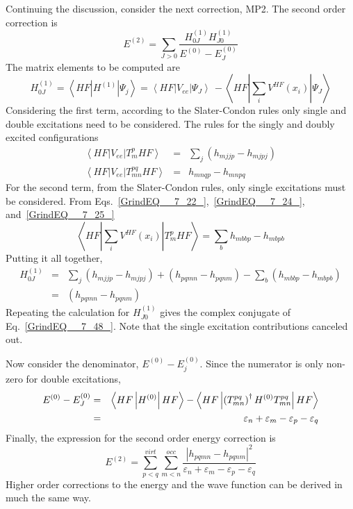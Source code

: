 \documentclass[11pt,oneside,final]{huthesis}%
\begin{document}
Continuing the discussion, consider the next correction, MP2.  The second order correction is
\begin{equation} \label{GrindEQ__7_43_} 
E^{(2)} =\sum _{J>0}\frac{H_{0J}^{(1)} H_{J0}^{(1)} }{E_{}^{(0)} -E_{J}^{(0)} } 
\end{equation} 
The matrix elements to be computed are
\begin{equation*}%
H_{0J}^{(1)} =\left\langle HF|H^{(1)} |\Psi _{j} \right\rangle =\left\langle HF\left|V_{ee} \right|\Psi _{J} \right\rangle \, -\left\langle HF\left|\sum _{i}V^{HF} (x_{i} ) \right|\Psi _{J} \right\rangle  
\end{equation*} 
Considering the first term, according to the Slater-Condon rules only single and double excitations need to be considered.  The rules for the singly and doubly  excited configurations
\begin{eqnarray*} %
\left\langle HF|V_{ee}  |T_{m}^{p} HF\right\rangle &=&\sum _{j}(h_{mjjp}  -h_{mjpj})    \\
\left\langle HF|V_{ee}  |T_{mn}^{pq} HF\right\rangle &=&h_{mnqp}  -h_{mnpq} 
\end{eqnarray*} 
For the second term, from the Slater-Condon rules, only single excitations must be considered.  From Eqs.~\eqref{GrindEQ__7_22_},~\eqref{GrindEQ__7_24_}, and~\eqref{GrindEQ__7_25_}
\begin{equation*} %
\left\langle HF\left|\sum _{i}V^{HF} (x_{i} ) \right|T_{m}^{p} HF\right\rangle =\sum _{b}h_{mbbp} -h_{mbpb}     
\end{equation*} 
Putting it all together,
\begin{eqnarray} 
 H_{0J}^{(1)}  &=&\sum _{j}(h_{mjjp}  -h_{mjpj})+(h_{pqmn}  -h_{pqnm}  )-\sum _{b}(h_{mbbp} -h_{mbpb} )   \nonumber\\ 
 &=&(h_{pqmn}  -h_{pqnm}  )  \label{GrindEQ__7_48_} 
\end{eqnarray} 
Repeating the calculation for $H_{J0}^{(1)}$ gives the complex conjugate of Eq.~\eqref{GrindEQ__7_48_}.  Note that the single excitation contributions canceled out.

 Now consider the denominator, $E_{}^{(0)} -E_{j}^{(0)} $.  Since the numerator is only non-zero for double excitations,
\begin{eqnarray} 
E^{(0)} -E_{J}^{(0)} &=&\left\langle HF\left|H^{(0)} \right|HF\right\rangle -\left\langle HF\left|\left(T_{mn}^{pq} \right)^{{\rm \dag }} H^{(0)} T_{mn}^{pq} \right|HF\right\rangle   \\ 
 &=&\varepsilon _{n} +\varepsilon _{m} -\varepsilon _{p} -\varepsilon _{q}   \label{GrindEQ__7_49_} 
\end{eqnarray} 
Finally, the expression for the second order energy correction is
\begin{equation} \label{GrindEQ__7_50_} 
E^{(2)} =\sum _{p<q}^{virt} \sum_{m<n}^{occ} \frac{\left|h_{pqmn} -h_{pqnm} \right|^{2} }{\varepsilon _{n} +\varepsilon _{m} -\varepsilon _{p} -\varepsilon _{q} }   
\end{equation} 
Higher order corrections to the energy and the wave function can be derived in much the same way. 
\end{document}
